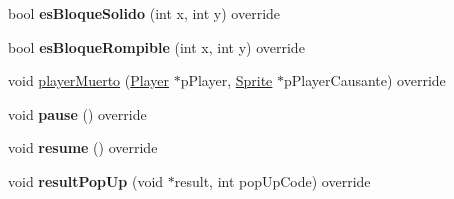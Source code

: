 \begin{DoxyCompactItemize}
\item 
bool {\bfseries es\+Bloque\+Solido} (int x, int y) override\hypertarget{class_juego_a9c9b2f882007b2a43285a3be6d9e0bf2}{}\label{class_juego_a9c9b2f882007b2a43285a3be6d9e0bf2}

\item 
bool {\bfseries es\+Bloque\+Rompible} (int x, int y) override\hypertarget{class_juego_ace6043603d44b94889830d54c1dad8a8}{}\label{class_juego_ace6043603d44b94889830d54c1dad8a8}

\item 
void \hyperlink{class_juego_a336e20deb3bfb1e0717c1bf967ff7a75}{player\+Muerto} (\hyperlink{class_player}{Player} $\ast$p\+Player, \hyperlink{class_sprite}{Sprite} $\ast$p\+Player\+Causante) override
\item 
void {\bfseries pause} () override\hypertarget{class_juego_aaf1cd7159334d07023c78d6b8a35e63f}{}\label{class_juego_aaf1cd7159334d07023c78d6b8a35e63f}

\item 
void {\bfseries resume} () override\hypertarget{class_juego_a3ad516348499c35140e5c61f3e55a6ec}{}\label{class_juego_a3ad516348499c35140e5c61f3e55a6ec}

\item 
void {\bfseries result\+Pop\+Up} (void $\ast$result, int pop\+Up\+Code) override\hypertarget{class_juego_ac141311099a222492201a52842c207b7}{}\label{class_juego_ac141311099a222492201a52842c207b7}

\end{DoxyCompactItemize}
